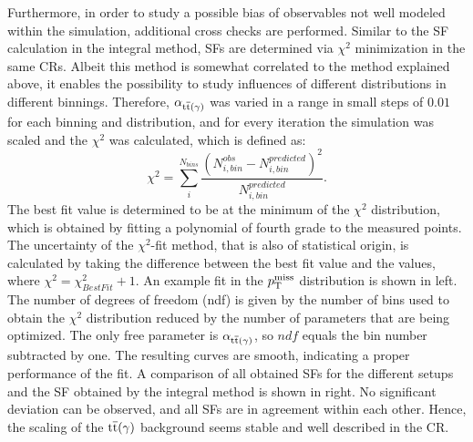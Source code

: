 Furthermore, in order to study a possible bias of observables not well modeled within the simulation, additional cross checks are performed. Similar to the SF calculation in the integral method, SFs are determined via $\chi^2$ minimization in the same CRs. Albeit this method is somewhat correlated to the method explained above, it enables the possibility to study influences of different distributions in different binnings. Therefore, $\alpha_{{\mathrm{t}\overline{\mathrm{t}}}(\gamma)}$ was varied in a range in small steps of $0.01$ for each binning and distribution, and for every iteration the simulation was scaled and the $\chi^2$ was calculated, which is defined as:
\begin{equation}
 \chi^2=\sum_i^{N_{bins}} \frac{\left(N_{i,bin}^{obs}-N_{i,bin}^{predicted}\right)^2}{N_{i,bin}^{predicted}}.
\end{equation}
The best fit value is determined to be at the minimum of the $\chi^2$ distribution, which is obtained by fitting a polynomial of fourth grade to the measured points. The uncertainty of the $\chi^2$-fit method, that is also of statistical origin, is calculated by taking the difference between the best fit value and the values, where $\chi^2=\chi^2_{BestFit}+1$. An example fit in the $p_{\mathrm{T}}^\text{miss}$ distribution is shown in  left. The number of degrees of freedom (ndf) is given by the number of bins used to obtain the $\chi^2$ distribution reduced by the number of parameters that are being optimized. The only free parameter is $\alpha_{{\mathrm{t}\overline{\mathrm{t}}}(\gamma)}$, so $ndf$ equals the bin number subtracted by one. The resulting curves are smooth, indicating a proper performance of the fit. A comparison of all obtained SFs for the different setups and the SF obtained by the integral method is shown in  right. No significant deviation can be observed, and all SFs are in agreement within each other. Hence, the scaling of the ${\mathrm{t}\overline{\mathrm{t}}}(\gamma)$ background seems stable and well described in the CR.
